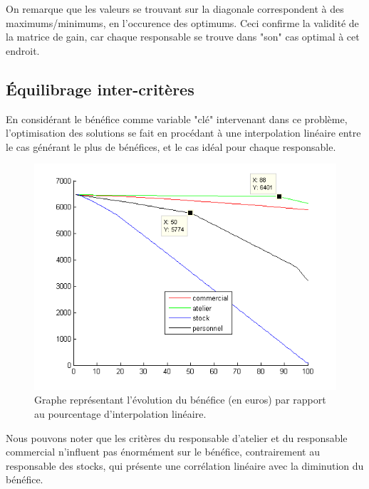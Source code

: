 \documentclass{article}
\begin{document}
On remarque que les valeurs se trouvant sur la diagonale correspondent à des
maximums/minimums, en l'occurence des optimums. Ceci confirme la validité de
la matrice de gain, car chaque responsable se trouve dans "son" cas optimal
à cet endroit.

\subsection{Équilibrage inter-critères}

En considérant le bénéfice comme variable "clé" intervenant dans ce problème,
l'optimisation des solutions se fait en procédant à une interpolation linéaire
entre le cas générant le plus de bénéfices, et le cas idéal pour chaque
responsable. \\

\begin{figure}
    \includegraphics[scale=0.3]{graph_multi.png}
    \caption{Graphe représentant l'évolution du bénéfice (en euros) par rapport
        au pourcentage d'interpolation linéaire.}
\end{figure}

Nous pouvons noter que les critères du responsable d'atelier et du responsable
commercial n'influent pas énormément sur le bénéfice, contrairement au
responsable des stocks, qui présente une corrélation linéaire avec la
diminution du bénéfice. \\
\end{document}
